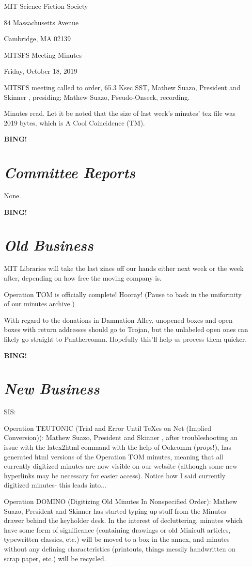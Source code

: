\documentclass[10pt]{article}
\newcommand{\bing}{{\bf BING!} }
\newcommand{\goto}[1]{\bing \vskip 12pt \section*{{\em{#1}}}}
\newcommand{\skinner}{Mathew Suazo, President and Skinner }
\newcommand{\onseck}{Mathew Suazo, Pseudo-Onseck}
\newcommand{\meetingdate}{Friday, October 18, 2019 }
\begin{document}
\begin{center}

MIT Science Fiction Society

84 Massachusetts Avenue

Cambridge, MA 02139

\vspace{12pt}

MITSFS Meeting Minutes

\meetingdate

\end{center}

\vspace{18pt}

\setlength{\parskip}{6pt}

\noindent
MITSFS meeting called to order, 65.3 Ksec SST,
\skinner, presiding; \onseck, recording.

Minutes read. Let it be noted that the size of last week's minutes' tex file was 2019 bytes, which is A Cool Coincidence (TM).

\goto{Committee Reports}

None.

\goto{Old Business}

MIT Libraries will take the last zines off our hands either next week or the week after, depending on how free the moving company is.

Operation TOM is officially complete! Hooray! (Pause to bask in the uniformity of our minutes archive.)

With regard to the donations in Damnation Alley, unopened boxes and open boxes with return addresses should go to Trojan, but the unlabeled open ones can likely go straight to Panthercomm. Hopefully this'll help us process them quicker.

\goto{New Business}

SIS:

Operation TEUTONIC (Trial and Error Until TeXes on Net (Implied Conversion)): \skinner, after troubleshooting an issue with the latex2html command with the help of Ookcomm (props!), has generated html versions of the Operation TOM minutes, meaning that all currently digitized minutes are now visible on our website (although some new hyperlinks may be necessary for easier access). Notice how I said currently digitized minutes- this leads into...

Operation DOMINO (Digitizing Old Minutes In Nonspecified Order): \skinner has started typing up stuff from the Minutes drawer behind the keyholder desk. In the interest of decluttering, minutes which have some form of significance (containing drawings or old Minicult articles, typewritten classics, etc.) will be moved to a box in the annex, and minutes without any defining characteristics (printouts, things messily handwritten on scrap paper, etc.) will be recycled.
\end{document}
